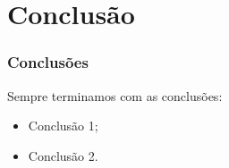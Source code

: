 
\section{Conclusão}

\begin{frame}
 \frametitle{Conclusões}

 \noindent Sempre terminamos com as conclusões:

 \begin{itemize}
  \item Conclusão 1;
  \item Conclusão 2.
 \end{itemize}

\end{frame}
